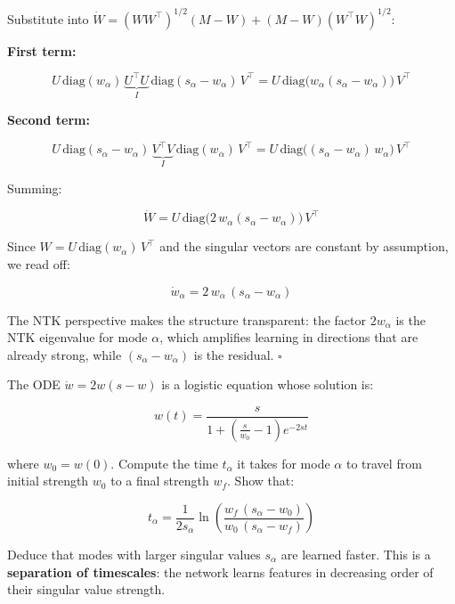 \documentclass[11pt]{article}
\begin{document}
\begin{solution}[ex:td-3aii]
Substitute into
\(\dot{W} = (WW^\top)^{1/2}(M-W) + (M-W)(W^\top W)^{1/2}\):

\textbf{First term:}

\[U\,\text{diag}(w_\alpha)\,\underbrace{U^\top U}_{I}\,\text{diag}(s_\alpha - w_\alpha)\,V^\top = U\,\text{diag}\big(w_\alpha(s_\alpha - w_\alpha)\big)\,V^\top\]

\textbf{Second term:}

\[U\,\text{diag}(s_\alpha - w_\alpha)\,\underbrace{V^\top V}_{I}\,\text{diag}(w_\alpha)\,V^\top = U\,\text{diag}\big((s_\alpha - w_\alpha)\,w_\alpha\big)\,V^\top\]

Summing:

\[\dot{W} = U\,\text{diag}\big(2\,w_\alpha(s_\alpha - w_\alpha)\big)\,V^\top\]

Since \(W = U\,\text{diag}(w_\alpha)\,V^\top\) and the singular vectors
are constant by assumption, we read off:

\[\boxed{\dot{w}_\alpha = 2\,w_\alpha\,(s_\alpha - w_\alpha)}\]

The NTK perspective makes the structure transparent: the factor
\(2w_\alpha\) is the NTK eigenvalue for mode \(\alpha\), which amplifies
learning in directions that are already strong, while
\((s_\alpha - w_\alpha)\) is the residual. \(\square\)
\end{solution}

\begin{exercise}
\label{ex:td-3b}
The ODE
\(\dot{w} = 2w(s - w)\) is a logistic equation whose solution is:

\[w(t) = \frac{s}{1 + \left(\frac{s}{w_0} - 1\right)e^{-2st}}\]

where \(w_0 = w(0)\). Compute the time \(t_\alpha\) it takes for mode
\(\alpha\) to travel from initial strength \(w_0\) to a final strength
\(w_f\). Show that:

\[t_\alpha = \frac{1}{2 s_\alpha} \ln\left(\frac{w_f\,(s_\alpha - w_0)}{w_0\,(s_\alpha - w_f)}\right)\]

Deduce that modes with larger singular values \(s_\alpha\) are learned
faster. This is a \textbf{separation of timescales}: the network learns
features in decreasing order of their singular value strength.
\end{exercise}
\end{document}
